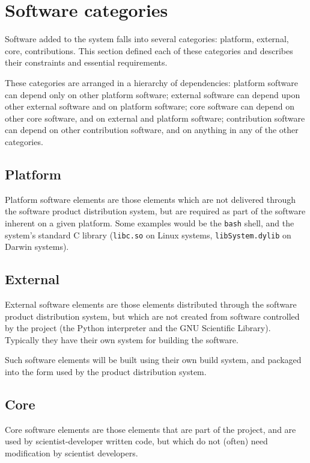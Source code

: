 \documentclass[draftmode,draftwater]{memarticle}
\newcommand{\prog}[1]%
  {\texttt{#1}}
\begin{document}
\section{Software categories}

Software added to the system falls into several categories: platform,
external, core, contributions. This section defined each of these
categories and describes their constraints and essential requirements.

These categories are arranged in a hierarchy of dependencies: platform
software can depend only on other platform software; external software
can depend upon other external software and on platform software; core
software can depend on other core software, and on external and platform
software; contribution software can depend on other contribution
software, and on anything in any of the other categories.

\subsection{Platform}

Platform software elements are those elements which are not delivered
through the software product distribution system, but are required as
part of the software inherent on a given platform. Some examples would
be the \prog{bash} shell, and the system's standard C library
(\prog{libc.so} on Linux systems, \prog{libSystem.dylib} on Darwin
systems).

\subsection{External}

External software elements are those elements distributed through the
software product distribution system, but which are not created from
software controlled by the project (\eg the Python interpreter and the
GNU Scientific Library). Typically they have their own system for
building the software.

Such software elements will be built using their own build system, and
packaged into the form used by the product distribution system.

\subsection{Core}

Core software elements are those elements that are part of the project,
and are used by scientist-developer written code, but which do not
(often) need modification by scientist developers.
\end{document}
